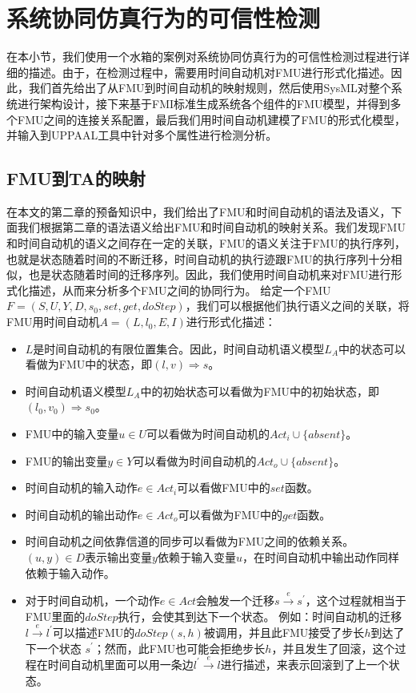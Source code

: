 \section{系统协同仿真行为的可信性检测}
在本小节，我们使用一个水箱的案例对系统协同仿真行为的可信性检测过程进行详细的描述。由于，在检测过程中，需要用时间自动机对FMU进行形式化描述。因此，我们首先给出了从FMU到时间自动机的映射规则，然后使用SysML对整个系统进行架构设计，接下来基于FMI标准生成系统各个组件的FMU模型，并得到多个FMU之间的连接关系配置，最后我们用时间自动机建模了FMU的形式化模型，并输入到UPPAAL工具中针对多个属性进行检测分析。
\subsection{FMU到TA的映射} 
\label{sec:encode}
在本文的第二章的预备知识中，我们给出了FMU和时间自动机的语法及语义，下面我们根据第二章的语法语义给出FMU和时间自动机的映射关系。我们发现FMU和时间自动机的语义之间存在一定的关联，FMU的语义关注于FMU的执行序列，也就是状态随着时间的不断迁移，时间自动机的执行迹跟FMU的执行序列十分相似，也是状态随着时间的迁移序列。因此，我们使用时间自动机来对FMU进行形式化描述，从而来分析多个FMU之间的协同行为。
给定一个FMU$F=(S,U,Y,D,s_{0},set,get,doStep)$，我们可以根据他们执行语义之间的关联，将FMU用时间自动机$\textit{A}=(L,l_{0},E,I)$进行形式化描述：
\begin{itemize}
\item
$L$是时间自动机的有限位置集合。因此，时间自动机语义模型$L_{\textit{A}}$中的状态可以看做为FMU中的状态，即$(l,v) \Rightarrow s$。
\item
时间自动机语义模型$L_{\textit{A}}$中的初始状态可以看做为FMU中的初始状态，即$(l_{0},v_{0}) \Rightarrow s_{0}$。
\item
FMU中的输入变量$u \in U$可以看做为时间自动机的$Act_{i} \cup \{absent\}$。
\item
FMU的输出变量$y \in Y$可以看做为时间自动机的$Act_{o} \cup \{absent\}$。
\item
时间自动机的输入动作$e \in Act_{i}$可以看做FMU中的$set$函数。
\item
时间自动机的输出动作$e \in Act_{o}$可以看做为FMU中的$get$函数。  
\item
时间自动机之间依靠信道的同步可以看做为FMU之间的依赖关系。 $(u,y) \in D$表示输出变量$y$依赖于输入变量$u$，在时间自动机中输出动作同样依赖于输入动作。
\item
对于时间自动机，一个动作$e \in Act$会触发一个迁移$s \xrightarrow{e} s^{\prime}$，这个过程就相当于FMU里面的$doStep$执行，会使其到达下一个状态。 例如：时间自动机的迁移$l \xrightarrow{e} l^{\prime}$可以描述FMU的$doStep(s,h)$被调用，并且此FMU接受了步长$h$到达了下一个状态 $s^{\prime}$；然而，此FMU也可能会拒绝步长$h$，并且发生了回滚，这个过程在时间自动机里面可以用一条边$l^{\prime} \xrightarrow{e} l$进行描述，来表示回滚到了上一个状态。

\end{itemize}
